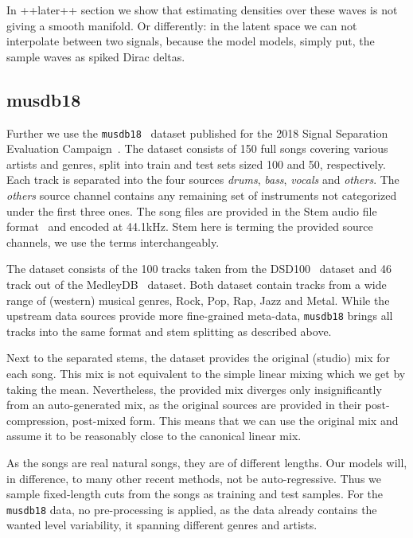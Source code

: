 In ++later++ section we show that estimating densities over these waves is not giving a smooth manifold. Or differently: in the latent space we can not interpolate between two signals, because the model models, simply put, the sample waves as spiked Dirac deltas.


\subsection{musdb18}
Further we use the \texttt{musdb18}~\cite{rafiiMUSDB182017} dataset published for the 2018 Signal Separation Evaluation Campaign~\cite{stoter20182018}. The dataset consists of 150 full songs covering various artists and genres, split into train and test sets sized 100 and 50, respectively. Each track is separated into the four sources \emph{drums}, \emph{bass}, \emph{vocals} and \emph{others}. The \emph{others} source channel contains any remaining set of instruments not categorized under the first three ones. The song files are provided in the Stem audio file format~\cite{nativeinstrumentsStem} and encoded at 44.1kHz. Stem here is terming the provided source channels, we use the terms interchangeably.

The dataset consists of the 100 tracks taken from the DSD100~\cite{SiSEC16} dataset and 46 track out of the MedleyDB~\cite{bittnerMedleyDB2016} dataset. Both dataset contain tracks from a wide range of (western) musical genres, Rock, Pop, Rap, Jazz and Metal. While the upstream data sources provide more fine-grained meta-data, \texttt{musdb18} brings all tracks into the same format and stem splitting as described above.

Next to the separated stems, the dataset provides the original (studio) mix for each song. This mix is not equivalent to the simple linear mixing which we get by taking the mean. Nevertheless, the provided mix diverges only insignificantly from an auto-generated mix, as the original sources are provided in their post-compression, post-mixed form. This means that we can use the original mix and assume it to be reasonably close to the canonical linear mix.

As the songs are real natural songs, they are of different lengths. Our models will, in difference, to many other recent methods, not be auto-regressive. Thus we sample fixed-length cuts from the songs as training and test samples. For the \texttt{musdb18} data, no pre-processing is applied, as the data already contains the wanted level variability, it spanning different genres and artists.

